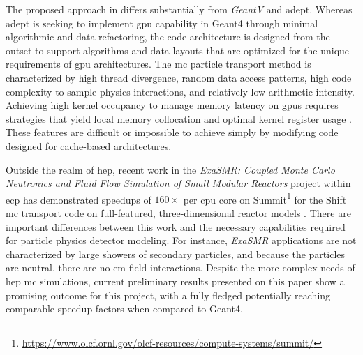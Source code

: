 The proposed approach in \celeritas differs substantially from \emph{GeantV} and
\acs{adept}. Whereas \acs{adept} is seeking to implement \ac{gpu} capability in
Geant4 through minimal algorithmic and data refactoring, the \celeritas code
architecture is designed from the outset to support algorithms and data layouts
that are optimized for the unique requirements of \ac{gpu} architectures. The
\ac{mc} particle transport method is characterized by high thread divergence,
random data access patterns, high code complexity to sample physics
interactions, and relatively low arithmetic intensity.  Achieving high kernel
occupancy to manage memory latency on \acp{gpu} requires strategies that yield
local memory collocation and optimal kernel register usage
\cite{hamilton_continuous-energy_2019}.  These features are difficult or
impossible to achieve simply by modifying code designed for cache-based
architectures.

Outside the realm of \ac{hep}, recent work in the \emph{ExaSMR: Coupled Monte
Carlo Neutronics and Fluid Flow Simulation of Small Modular Reactors} project
within \ac{ecp} has demonstrated speedups of $160\times$ per \ac{cpu} core on
Summit\footnote
{
    \url{https://www.olcf.ornl.gov/olcf-resources/compute-systems/summit/}
}
for the Shift \ac{mc} transport code on full-featured, three-dimensional reactor
models \cite{hamilton_continuous-energy_2019}. There are important differences
between this work and the necessary capabilities required for particle physics
detector modeling. For instance, \emph{ExaSMR} applications are not
characterized by large showers of secondary particles, and because the particles
are neutral, there are no \ac{em} field interactions. Despite the more complex
needs of \ac{hep} \ac{mc} simulations, current preliminary results presented on
this paper show a promising outcome for this project, with a fully fledged
\celeritas potentially reaching comparable speedup factors when compared to
Geant4.
